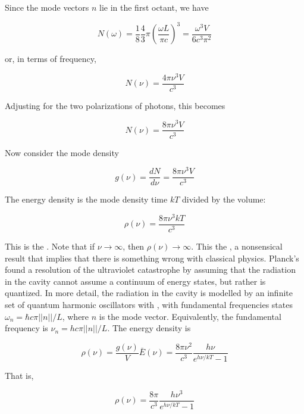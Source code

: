 Since the mode vectors $n$ lie in the first octant, we have

\begin{equation}
N(\omega) = \frac{1}{8}\frac{4}{3}\pi\left(\frac{\omega L}{\pi c}\right)^3
 = \frac{\omega^3 V }{6c^3 \pi^2}
\end{equation}


or, in terms of frequency,

\begin{equation}
N(\nu) = \frac{4\pi\nu^3 V }{c^3}
\end{equation}


Adjusting for the two polarizations of photons, this becomes

\begin{equation}
N(\nu) = \frac{8\pi\nu^3 V }{c^3}
\end{equation}

Now consider the mode density

\begin{equation}
g(\nu) =\frac{ dN}{d\nu} =  \frac{8\pi\nu^3 V }{c^3}
\end{equation}

The energy density is the mode density time $kT$ divided by the volume:

\begin{equation}
\rho(\nu) = \frac{8\pi\nu^3 kT }{c^3}
\end{equation}


This is the .  Note that if $\nu \to \infty$, then
$\rho(\nu) \to \infty$.  This the , a nonsensical result that implies that there is something wrong with classical physics.  Planck's found a resolution of the ultraviolet catastrophe by assuming that the radiation in the cavity cannot assume a continuum of energy states, but rather is quantized.  In more detail, the radiation in the cavity is modelled by an infinite set of quantum harmonic oscillators with , with fundamental frequencies states $\omega_n = \hbar c\pi ||n||/L$, where $n$ is the mode vector.  Equivalently, the fundamental frequency is $\nu_n = h c\pi ||n||/L$.  The energy density is

\begin{equation}
\rho(\nu) = \frac{g(\nu)}{V}\bar E(\nu)
  = \frac{8\pi\nu^2 }{c^3} \frac{h\nu}{e^{h\nu/kT} - 1}
\end{equation}


That is,

\begin{equation}
\rho(\nu) = \frac{8\pi }{c^3} \frac{h\nu^3}{e^{h\nu/kT} - 1}
\end{equation}

